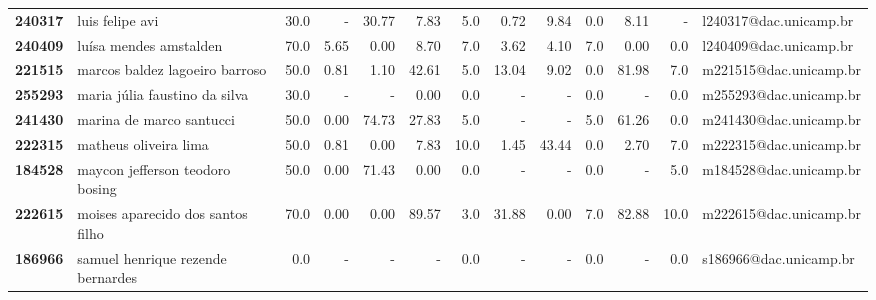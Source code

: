 \documentclass[11pt]{article}
\begin{document}
\begin{center}
\begin{landscape}
\begin{longtable}{llrrrrrrrrrrl}
\textbf{240317} &                       luis felipe avi &                  30.0 &           - &       30.77 &        7.83 &                      5.0 &        0.72 &        9.84 &                        0.0 &        8.11 &                        - &  l240317@dac.unicamp.br \\
\textbf{240409} &                luísa mendes amstalden &                  70.0 &        5.65 &        0.00 &        8.70 &                      7.0 &        3.62 &        4.10 &                        7.0 &        0.00 &                      0.0 &  l240409@dac.unicamp.br \\
\textbf{221515} &        marcos baldez lagoeiro barroso &                  50.0 &        0.81 &        1.10 &       42.61 &                      5.0 &       13.04 &        9.02 &                        0.0 &       81.98 &                      7.0 &  m221515@dac.unicamp.br \\
\textbf{255293} &         maria júlia faustino da silva &                  30.0 &           - &           - &        0.00 &                      0.0 &           - &           - &                        0.0 &           - &                      0.0 &  m255293@dac.unicamp.br \\
\textbf{241430} &              marina de marco santucci &                  50.0 &        0.00 &       74.73 &       27.83 &                      5.0 &           - &           - &                        5.0 &       61.26 &                      0.0 &  m241430@dac.unicamp.br \\
\textbf{222315} &                 matheus oliveira lima &                  50.0 &        0.81 &        0.00 &        7.83 &                     10.0 &        1.45 &       43.44 &                        0.0 &        2.70 &                      7.0 &  m222315@dac.unicamp.br \\
\textbf{184528} &       maycon jefferson teodoro bosing &                  50.0 &        0.00 &       71.43 &        0.00 &                      0.0 &           - &           - &                        0.0 &           - &                      5.0 &  m184528@dac.unicamp.br \\
\textbf{222615} &     moises aparecido dos santos filho &                  70.0 &        0.00 &        0.00 &       89.57 &                      3.0 &       31.88 &        0.00 &                        7.0 &       82.88 &                     10.0 &  m222615@dac.unicamp.br \\
\textbf{186966} &     samuel henrique rezende bernardes &                   0.0 &           - &           - &           - &                      0.0 &           - &           - &                        0.0 &           - &                      0.0 &  s186966@dac.unicamp.br \\

\end{longtable}
\end{landscape}
\end{center}
\end{document}
